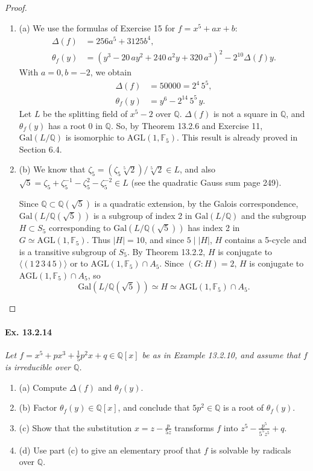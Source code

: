 \documentclass[11pt,a4paper]{article}
\newcommand{\be} {\begin{enumerate}}
\newcommand{\ee} {\end{enumerate}}
\newcommand{\Q}{\mathbb{Q}}
\newcommand{\F}{\mathbb{F}}
\newcommand{\Gal}{\mathrm{Gal}}
\begin{document}
\begin{proof}
\be
\item[(a)] We use the formulas of Exercise 15 for $f =x^5+ax+b$:
\begin{align*}
\Delta(f) &= 256a^5+3125b^4,\\
\theta_f(y) &=  {\left(y^{3} - 20 \, a y^{2}  + 240 \,a^{2} y + 320 \, a^{3} \right)}^{2} - 2^{10}\Delta(f) y.
\end{align*}
With $a=0, b=-2$, we obtain
\begin{align*}
\Delta(f) &= 50000= 2^4\,  5^5,\\
\theta_f(y) &=  y^6- 2^{14}\, 5^5\, y.
\end{align*}
Let $L$ be the splitting field of $x^5 - 2$ over $\Q$.
 $\Delta(f)$ is not a square in $\mathbb{Q}$, and $\theta_f(y)$ has a root 0 in $\Q$. So, by Theorem 13.2.6 and Exercise 11, $\Gal(L/\Q)$ is isomorphic to $\mathrm{AGL}(1,\F_5)$. This result is  already proved in Section 6.4.
 
 \item[(b)] 
  We know that $\zeta_5 = (\zeta_5 \sqrt[5]{2})/ \sqrt[5]{2} \in L$, and also $\sqrt{5} = \zeta_5 + \zeta_5^{-1} - \zeta_5^2 - \zeta_5^{-2} \in L$ (see the quadratic Gauss sum page 249).
  
 Since $\Q \subset \Q(\sqrt{5})$ is a quadratic extension, by the Galois correspondence, $\Gal(L / \Q(\sqrt{5}))$ is a subgroup of index 2 in $\Gal(L/\Q)$ and the subgroup $H \subset S_5$ corresponding to $\Gal(L/\Q(\sqrt{5}))$ has index 2 in $G \simeq \mathrm{AGL}(1,\F_5)$. Thus $|H| = 10$, and since $5 \mid |H|$, $H$ contains a 5-cycle and is a transitive subgroup of $S_5$.  By Theorem 13.2.2, $H$ is conjugate to $\langle (1\,2\,3\,4\,5) \rangle$ or to $ \mathrm{AGL}(1,\F_5) \cap A_5$. Since $(G:H) = 2$, $H$ is conjugate to  $\mathrm{AGL}(1,\F_5) \cap A_5$, so
 $$\Gal(L/\Q(\sqrt{5})) \simeq H \simeq \mathrm{AGL}(1,\F_5) \cap A_5.$$
 \ee
\end{proof}

\paragraph{Ex. 13.2.14}

{\it Let $f = x^5 + px^3 +\frac{1}{5} p^2x + q \in \Q[x]$ be as in Example 13.2.10, and assume that $f$ is irreducible over $\Q$.
\be
\item[(a)] Compute $\Delta(f)$ and $\theta_f(y)$.
\item[(b)] Factor $\theta_f(y) \in \Q[x]$, and conclude that $5p^2 \in \Q$ is a root of $\theta_f(y)$.
\item[(c)] Show that the substitution $x = z - \frac{p}{5z}$ transforms $f$ into $z^5 - \frac{p^5}{5^5z^5} + q$.
\item[(d)] Use part (c) to give an elementary proof that $f$ is solvable by radicals over $\Q$.
\ee
}
\end{document}

